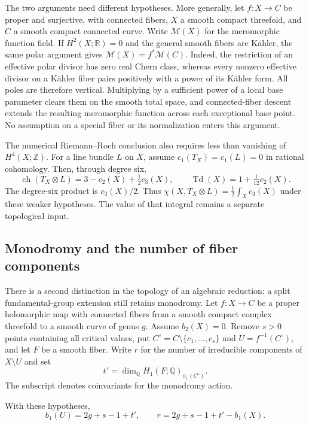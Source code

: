 \documentclass[11pt]{article}
\numberwithin{equation}{section}
\begin{document}
The two arguments need different hypotheses. More generally, let
$f:X\to C$ be proper and surjective, with connected fibers, $X$
a smooth compact threefold, and $C$ a smooth compact connected
curve. Write $\mathcal M(X)$ for the meromorphic function field. If
$H^2(X;\mathbb R)=0$ and the general smooth fibers are K\"ahler,
the same polar argument gives $\mathcal M(X)=f^*\mathcal M(C)$.
Indeed, the restriction of an effective polar divisor has zero
real Chern class, whereas every nonzero effective divisor on a
K\"ahler fiber pairs positively with a power of its K\"ahler form.
All poles are therefore vertical. Multiplying by a sufficient
power of a local base parameter clears them on the smooth total
space, and connected-fiber descent extends the resulting
meromorphic function across each exceptional base point.
No assumption on a special fiber or its normalization enters this
argument.

The numerical Riemann--Roch conclusion also requires less than
vanishing of $H^4(X;\mathbb Z)$. For a line bundle $L$ on $X$,
assume $c_1(T_X)=c_1(L)=0$ in rational cohomology. Then, through
degree six,
\[
 \operatorname{ch}(T_X\otimes L)=3-c_2(X)+\tfrac12c_3(X),
 \qquad \operatorname{Td}(X)=1+\tfrac1{12}c_2(X).
\]
The degree-six product is $c_3(X)/2$. Thus
$\chi(X,T_X\otimes L)=\tfrac12\int_Xc_3(X)$ under these weaker
hypotheses. The value of that integral remains a separate
topological input.

\subsection{Monodromy and the number of fiber components}

There is a second distinction in the topology of an algebraic
reduction: a split fundamental-group extension still retains
monodromy. Let $f:X\to C$ be a proper holomorphic map with connected
fibers from a smooth compact complex threefold to a smooth curve
of genus $g$. Assume $b_2(X)=0$. Remove $s>0$ points containing all
critical values, put $C^\circ=C\setminus\{c_1,\ldots,c_s\}$ and
$U=f^{-1}(C^\circ)$, and let $F$ be a smooth fiber. Write $r$ for
the number of irreducible components of $X\setminus U$ and set
\[
 t'=\dim_{\mathbb Q}
 H_1(F;\mathbb Q)_{\pi_1(C^\circ)}.
\]
The subscript denotes coinvariants for the monodromy action.

\begin{proposition}\label{ad:prop:components}
With these hypotheses,
\[
 b_1(U)=2g+s-1+t',\qquad
 r=2g+s-1+t'-b_1(X).
\]
\end{proposition}
\end{document}
